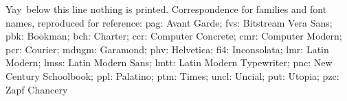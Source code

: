 Yay~below this line nothing is printed.
%
Correspondence for families and font names, reproduced for reference: pag: Avant Garde; fvs: Bitstream Vera Sans; pbk: Bookman; bch: Charter; ccr: Computer Concrete; cmr: Computer Modern; pcr: Courier; mdugm: Garamond; phv: Helvetica; fi4: Inconsolata; lmr: Latin Modern; lmss: Latin Modern Sans; lmtt: Latin Modern Typewriter; pnc: New Century Schoolbook; ppl: Palatino; ptm: Times; uncl: Uncial; put: Utopia; pzc: Zapf Chancery
